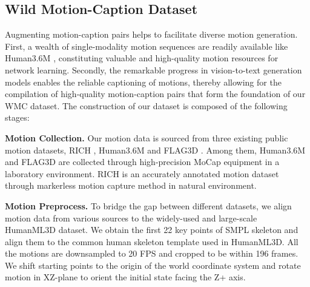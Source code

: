 \documentclass[letterpaper]{article} \usepackage{aaai24}
\begin{document}
\subsection{Wild Motion-Caption Dataset}
Augmenting motion-caption pairs helps to facilitate diverse motion generation.
First, a wealth of single-modality motion sequences are readily available like Human3.6M \cite{h36m_pami}, constituting valuable and high-quality motion resources for network learning. Secondly, the remarkable progress in vision-to-text generation models enables the reliable captioning of motions, thereby allowing for the compilation of high-quality motion-caption pairs that form the foundation of our WMC dataset. The construction of our dataset is composed of the following stages:

\noindent\textbf{Motion Collection.} Our motion data is sourced from three existing public motion datasets, RICH \cite{Huang:CVPR:2022}, Human3.6M \cite{h36m_pami} and FLAG3D \cite{tang2023flag3d}. Among them, Human3.6M and FLAG3D are collected through high-precision MoCap equipment in a laboratory environment. RICH is an accurately annotated motion dataset through markerless motion capture method in natural environment.


\noindent\textbf{Motion Preprocess.} To bridge the gap between different datasets, we align motion data from various sources to the widely-used and large-scale HumanML3D dataset\cite{guo2022generating}. We obtain the first 22 key points of SMPL \cite{bogo2016smpl,pavlakos2019expressive} skeleton and align them to the common human skeleton template used in HumanML3D. All the motions are downsampled to 20 FPS and cropped to be within 196 frames. We shift starting points to the origin of the world coordinate system and rotate motion in XZ-plane to orient the initial state facing the Z+ axis.
\end{document}
